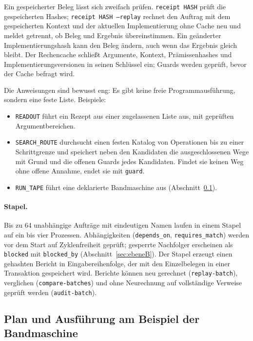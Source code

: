 Ein gespeicherter Beleg lässt sich zweifach prüfen. \texttt{receipt HASH} prüft die gespeicherten Hashes; \texttt{receipt HASH --replay}
rechnet den Auftrag mit dem gespeicherten Kontext und der aktuellen Implementierung ohne Cache neu und meldet getrennt, ob Beleg und
Ergebnis übereinstimmen. Ein geänderter Implementierungshash kann den Beleg ändern, auch wenn das Ergebnis gleich bleibt. Der Rechencache
schließt Argumente, Kontext, Prämissenhashes und Implementierungsversionen in seinen Schlüssel ein; Guards werden geprüft, bevor der Cache
befragt wird.

Die Anweisungen sind bewusst eng: Es gibt keine freie Programmausführung, sondern eine feste Liste. Beispiele:
\begin{itemize}[nosep]
\item \texttt{READOUT} führt ein Rezept aus einer zugelassenen Liste aus, mit geprüften Argumentbereichen.
\item \texttt{SEARCH\_ROUTE} durchsucht einen festen Katalog von Operationen bis zu einer Schrittgrenze und speichert neben den Kandidaten
die ausgeschlossenen Wege mit Grund und die offenen Guards jedes Kandidaten. Findet sie keinen Weg ohne offene Annahme, endet sie mit
\texttt{guard}.
\item \texttt{RUN\_TAPE} führt eine deklarierte Bandmaschine aus (Abschnitt~\ref{sec:band}).
\end{itemize}

\paragraph{Stapel.} Bis zu 64 unabhängige Aufträge mit eindeutigen Namen laufen in einem Stapel auf ein bis vier Prozessen. Abhängigkeiten
(\texttt{depends\_on}, \texttt{requires\_match}) werden vor dem Start auf Zyklenfreiheit geprüft; gesperrte Nachfolger erscheinen als
\texttt{blocked} mit \texttt{blocked\_by} (Abschnitt~\ref{sec:ebeneB}). Der Stapel erzeugt einen gehashten Bericht in Eingabereihenfolge,
der mit den Einzelbelegen in einer Transaktion gespeichert wird. Berichte können neu gerechnet (\texttt{replay-batch}), verglichen
(\texttt{compare-batches}) und ohne Neurechnung auf vollständige Verweise geprüft werden (\texttt{audit-batch}).

\subsection{Plan und Ausführung am Beispiel der Bandmaschine}\label{sec:band}

